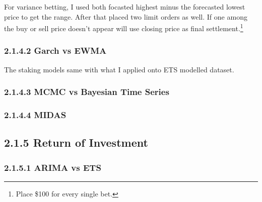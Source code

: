 \documentclass[]{tufte-book}
\begin{document}
For variance betting, I used both focasted highest minus the forecasted
lowest price to get the range. After that placed two limit orders as
well. If one among the buy or sell price doesn't appear will use closing
price as final settlement.\footnote{Place \$100 for every single bet.}

\subsubsection{2.1.4.2 Garch vs EWMA}\label{garch-vs-ewma-2}

The staking models same with what I applied onto ETS modelled dataset.

\subsubsection{2.1.4.3 MCMC vs Bayesian Time
Series}\label{mcmc-vs-bayesian-time-series-2}

\subsubsection{2.1.4.4 MIDAS}\label{midas-2}

\subsection{2.1.5 Return of Investment}\label{return-of-investment}

\subsubsection{2.1.5.1 ARIMA vs ETS}\label{arima-vs-ets-3}
\end{document}
